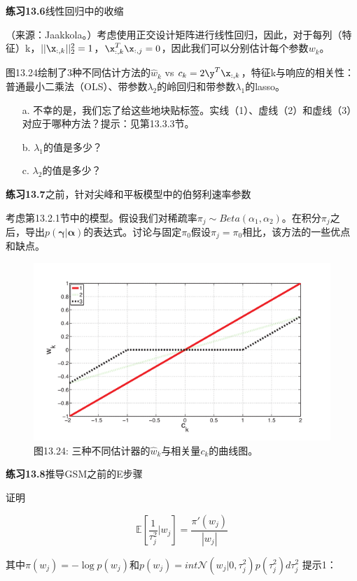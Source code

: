 \documentclass[a4paper]{article}
\begin{document}
\textbf{练习13.6}线性回归中的收缩

（来源：Jaakkola。）考虑使用正交设计矩阵进行线性回归，因此，对于每列（特征）k，$||\x_{:,k}||_2^2=1$，$\x_{:,k}^T\x_{:,j}=0$，因此我们可以分别估计每个参数$w_k$。

图13.24绘制了3种不同估计方法的$\hat{w}_k$  vs $c_k=2\y^T\x_{:,k}$，特征k与响应的相关性：普通最小二乘法（OLS）、带参数$\lambda_2$的岭回归和带参数$\lambda_1$的lasso。

\begin{itemize}
\item[a.] 不幸的是，我们忘了给这些地块贴标签。实线（1）、虚线（2）和虚线（3）对应于哪种方法？提示：见第13.3.3节。
\item[b.] $\lambda_1$的值是多少？
\item[c.] $\lambda_2$的值是多少？
\end{itemize}

\textbf{练习13.7}之前，针对尖峰和平板模型中的伯努利速率参数

考虑第13.2.1节中的模型。假设我们对稀疏率$\pi_j\sim Beta(\alpha_1,\alpha_2)$。在积分$\pi_j$之后，导出$p(\boldsymbol{\gamma}|\boldsymbol{\alpha})$的表达式。讨论与固定$\pi_0$假设$\pi_j=\pi_0$相比，该方法的一些优点和缺点。

\begin{figure}[h]
	\centering
	\includegraphics[width=0.7\linewidth]{fig13/figure24}
	\caption*{图13.24: 三种不同估计器的$\hat{w}_k$与相关量$c_k$的曲线图。}
\end{figure}

\textbf{练习13.8}推导GSM之前的E步骤

证明

\begin{equation}
	\mathbb{E}\left[\frac{1}{\tau_j^2}|w_j\right]=\dfrac{\pi'(w_j)}{|w_j|}\tag{13.197}
\end{equation}

其中$\pi (w_j)=-\log p(w_j)$和$p(w_j)=int \mathcal{N}(w_j|0,\tau_j^2)p(\tau_j^2)d\tau_j^2$
提示1：
\end{document}

